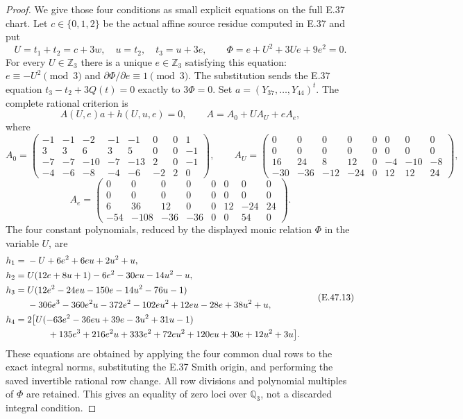 \begin{proof}
We give those four conditions as small explicit
equations on the full E.37 chart.  Let $c\in\{0,1,2\}$
be the actual affine source residue computed in
E.37 and put
\[
 U=t_1+t_2=c+3w,\quad u=t_2,\quad t_3=u+3e,
 \qquad \Phi=e+U^2+3Ue+9e^2=0.
 \tag{E.47.10a}
\]
For every $U\in\mathbb Z_3$ there is a unique
$e\in\mathbb Z_3$ satisfying this equation:
$e\equiv-U^2\pmod3$ and
$\partial\Phi/\partial e\equiv1\pmod3$.
The substitution sends the E.37 equation
$t_3-t_2+3Q(t)=0$ exactly to $3\Phi=0$.
Set $a=(Y_{37},\ldots,Y_{44})^t$.
The complete rational criterion is
\[
                         A(U,e)a+h(U,u,e)=0,
       \qquad A=A_0+U A_U+e A_e,
 \tag{E.47.10}
\]
where
\[
 A_0=\begin{pmatrix}
 -1&-1&-2&-1&-1&0&0&1\\
 3&3&6&3&5&0&0&-1\\
 -7&-7&-10&-7&-13&2&0&-1\\
 -4&-6&-8&-4&-6&-2&2&0
 \end{pmatrix},\qquad
 A_U=\begin{pmatrix}
 0&0&0&0&0&0&0&0\\0&0&0&0&0&0&0&0\\
 16&24&8&12&0&-4&-10&-8\\
 -30&-36&-12&-24&0&12&12&24
 \end{pmatrix},
 \tag{E.47.11}
\]
\[
 A_e=\begin{pmatrix}
 0&0&0&0&0&0&0&0\\0&0&0&0&0&0&0&0\\
 6&36&12&0&0&12&-24&24\\
 -54&-108&-36&-36&0&0&54&0
 \end{pmatrix}.
 \tag{E.47.12}
\]
The four constant polynomials, reduced by the
displayed monic relation $\Phi$ in the variable
$U$, are
\[
\begin{aligned}
 h_1={}&-U+6e^2+6eu+2u^2+u,\\
 h_2={}&U(12e+8u+1)-6e^2-30eu-14u^2-u,\\
 h_3={}&U(12e^2-24eu-150e-14u^2-76u-1)\\
       &-306e^3-360e^2u-372e^2-102eu^2
                       +12eu-28e+38u^2+u,\\
 h_4={}&2\bigl[U(-63e^2-36eu+39e-3u^2+31u-1)\\
       &\hspace{8mm}+135e^3+216e^2u+333e^2+72eu^2
                       +120eu+30e+12u^2+3u\bigr].
\end{aligned}
 \tag{E.47.13}
\]
These equations are obtained by applying the
four common dual rows to the exact integral
norms, substituting the E.37 Smith origin, and
performing the saved invertible rational row
change.  All row divisions and polynomial
multiples of $\Phi$ are retained.  This gives
an equality of zero loci over $\mathbb Q_3$,
not a discarded integral condition.


\end{proof}
